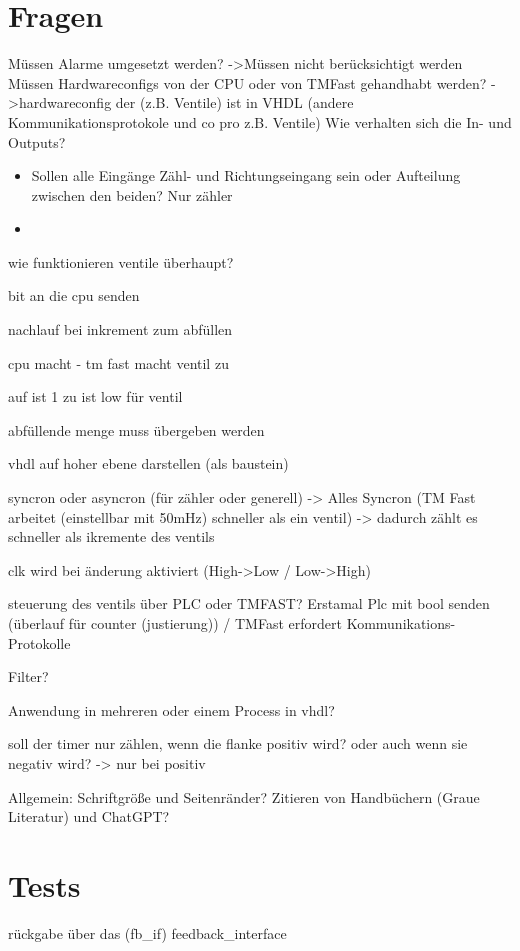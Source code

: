 \chapter{Fragen}
Müssen Alarme umgesetzt werden? ->Müssen nicht berücksichtigt werden
Müssen Hardwareconfigs von der CPU oder von TMFast gehandhabt werden? ->hardwareconfig der (z.B. Ventile) ist in VHDL (andere Kommunikationsprotokole und co pro z.B. Ventile)
Wie verhalten sich die In- und Outputs? 
\begin{itemize}
    \item Sollen alle Eingänge Zähl- und Richtungseingang sein oder Aufteilung zwischen den beiden? Nur zähler
    \item 
\end{itemize}

wie funktionieren ventile überhaupt?

bit an die cpu senden 

nachlauf bei inkrement zum abfüllen

cpu macht  - tm fast macht ventil zu

auf ist 1 zu ist low für ventil

abfüllende menge muss übergeben werden

vhdl auf hoher ebene darstellen (als baustein)

syncron oder asyncron (für zähler oder generell) -> Alles Syncron (TM Fast arbeitet (einstellbar mit 50mHz) schneller als ein ventil) -> dadurch zählt es schneller als ikremente des ventils

clk wird bei änderung aktiviert (High->Low / Low->High)

steuerung des ventils über PLC oder TMFAST? Erstamal Plc mit bool senden (überlauf für counter (justierung)) / TMFast erfordert Kommunikations-Protokolle

Filter?

Anwendung in mehreren oder einem Process in vhdl?

soll der timer nur zählen, wenn die flanke positiv wird? oder auch wenn sie negativ wird? -> nur bei positiv

Allgemein:
Schriftgröße und Seitenränder?
Zitieren von Handbüchern (Graue Literatur) und ChatGPT?

\chapter{Tests}

rückgabe über das (fb\_if) feedback\_interface

